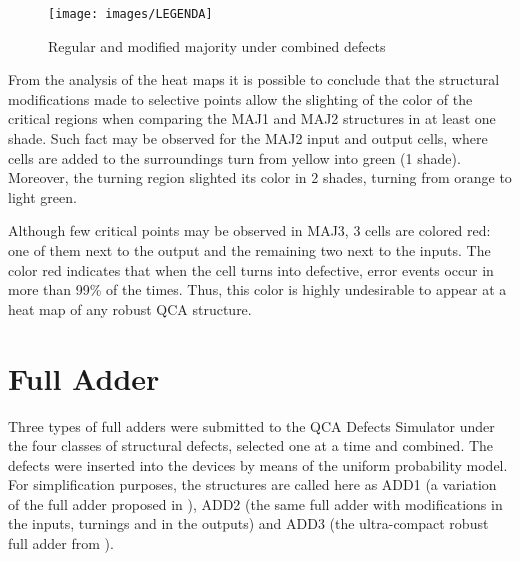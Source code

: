 \begin{figure}[H]
\center
{}
\hfill
{}
\linebreak
\hfill
{}
\linebreak
{\texttt{[image: images/LEGENDA]}
}
\caption{Regular and modified majority under combined defects}
\label{figure:majority_t1}
\end{figure}

From the analysis of the heat maps it is possible to conclude that the structural modifications made to selective points allow the slighting of the color of the critical regions when comparing the MAJ1 and MAJ2 structures in at least one shade. Such fact may be observed for the MAJ2 input and output cells, where cells are added to the surroundings turn from yellow into green (1 shade). Moreover, the turning region slighted its color in 2 shades, turning from orange to light green.

Although few critical points may be observed in MAJ3, 3 cells are colored red: one of them next to the output and the remaining two next to the inputs. The color red indicates that when the cell turns into defective, error events occur in more than 99\% of the times. Thus, this color is highly undesirable to appear at a heat map of any robust QCA structure.

\section{Full Adder}
\label{section:Full_Adder}

Three types of full adders were submitted to the QCA Defects Simulator under the four classes of structural defects, selected one at a time and combined. The defects were inserted into the devices by means of the uniform probability model. 
For simplification purposes, the structures are called here as ADD1 (a variation of the full adder proposed in \cite{bruschi11}), ADD2 (the same  full adder with modifications in the inputs, turnings and in the outputs) and ADD3 (the ultra-compact robust full adder from \cite{roohi15}).

